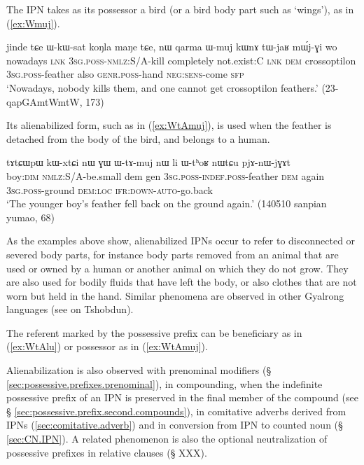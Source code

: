 The IPN  takes as its possessor a bird (or a bird body part such as `wings'), as in (\ref{ex:Wmuj}).

    \begin{exe}
\ex \label{ex:Wmuj}
 \gll   jinde tɕe ɯ-kɯ-sat koŋla maŋe tɕe, nɯ qarma ɯ-muj kɯnɤ tɯ-jaʁ mɯ́j-ɣi wo \\
 nowadays \textsc{lnk} \textsc{3sg.poss}-\textsc{nmlz}:S/A-kill completely not.exist:C \textsc{lnk} \textsc{dem} crossoptilon \textsc{3sg.poss}-feather also \textsc{genr.poss}-hand \textsc{neg}:\textsc{sens}-come \textsc{sfp} \\
 \glt `Nowadays, nobody kills them, and one cannot get crossoptilon feathers.' (23-qapGAmtWmtW, 173)
  \end{exe}

Its alienabilized form, such as  in (\ref{ex:WtAmuj}), is used when the feather is detached from the body of the bird, and belongs to a human.
  
\begin{exe}
\ex \label{ex:WtAmuj}
 \gll tɤtɕɯpɯ kɯ-xtɕi nɯ ɣɯ ɯ-tɤ-muj nɯ li ɯ-tʰoʁ nɯtɕu pjɤ-nɯ-jɣɤt  \\
 boy:\textsc{dim} \textsc{nmlz}:S/A-be.small dem gen \textsc{3sg.poss}-\textsc{indef.poss}-feather \textsc{dem} again \textsc{3sg.poss}-ground \textsc{dem:loc} \textsc{ifr}:\textsc{down}-\textsc{auto}-go.back  \\
 \glt `The younger boy's feather fell back on the ground again.' (140510 sanpian yumao, 68)
\end{exe}
 
As the examples above show, alienabilized IPNs occur to refer to disconnected or severed body parts, for instance body parts removed from an animal that are used or owned by a human or another animal on which they do not grow. They are also used for bodily fluids that have left the body, or also clothes that are not worn but held in the hand. Similar phenomena are observed in other Gyalrong languages (see \citealt[140]{jackson98morphology} on Tshobdun).

The referent marked by the possessive prefix can be beneficiary as in (\ref{ex:WtAlu}) or possessor as in (\ref{ex:WtAmuj}).
 
Alienabilization is also observed with prenominal modifiers (§ \ref{sec:possessive.prefixes.prenominal}), in compounding, when the indefinite possessive prefix of an IPN is preserved in the final member of the compound (see § \ref{sec:possessive.prefix.second.compounds}), in comitative adverbs derived from IPNs (\ref{sec:comitative.adverb}) and in conversion from IPN to counted noun (§ \ref{sec:CN.IPN}). A related phenomenon is also the optional neutralization of possessive prefixes in relative clauses (§ XXX).
 

